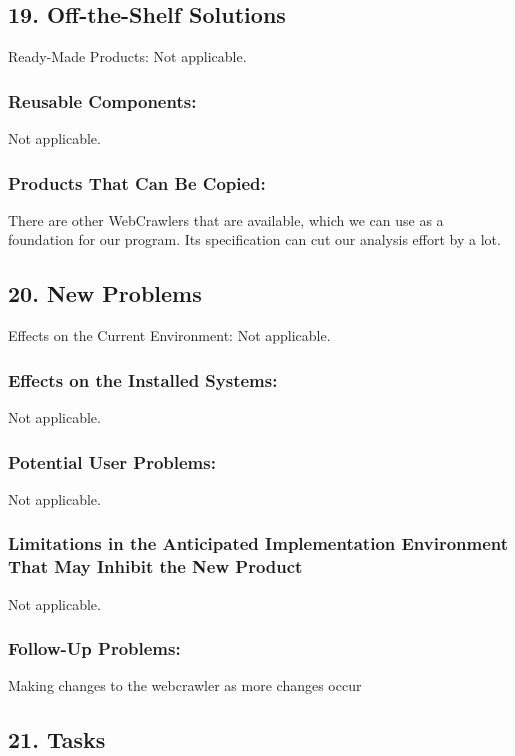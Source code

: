 \documentclass[titlepage]{article}
\begin{document}
\subsection{19. Off-the-Shelf Solutions }
Ready-Made Products:
Not applicable.

\subsubsection*{Reusable Components:}
Not applicable.

\subsubsection*{Products That Can Be Copied:}
There are other WebCrawlers that are available, which we can use as a foundation for our program. Its specification can cut our analysis effort by a lot.

\subsection{20. New Problems }
Effects on the Current Environment:
Not applicable.

\subsubsection*{Effects on the Installed Systems:}
Not applicable.

\subsubsection*{Potential User Problems:}
Not applicable.

\subsubsection*{Limitations in the Anticipated Implementation Environment That May Inhibit the New Product}

Not applicable.

\subsubsection*{Follow-Up Problems:}
Making changes to the webcrawler as more changes occur 

\subsection{21. Tasks} 
\end{document}
